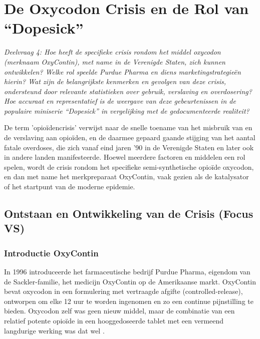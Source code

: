 \documentclass[11pt, a4paper]{report} %
\begin{document}
\chapter{De Oxycodon Crisis en de Rol van \enquote{Dopesick}}
\label{chap:oxycrisis}
\textit{Deelvraag 4: Hoe heeft de specifieke crisis rondom het middel oxycodon (merknaam OxyContin), met name in de Verenigde Staten, zich kunnen ontwikkelen? Welke rol speelde Purdue Pharma en diens marketingstrategieën hierin? Wat zijn de belangrijkste kenmerken en gevolgen van deze crisis, ondersteund door relevante statistieken over gebruik, verslaving en overdosering? Hoe accuraat en representatief is de weergave van deze gebeurtenissen in de populaire miniserie \enquote{Dopesick} in vergelijking met de gedocumenteerde realiteit?}

De term 'opioïdencrisis' verwijst naar de snelle toename van het misbruik van en de verslaving aan opioïden, en de daarmee gepaard gaande stijging van het aantal fatale overdoses, die zich vanaf eind jaren '90 in de Verenigde Staten en later ook in andere landen manifesteerde. Hoewel meerdere factoren en middelen een rol spelen, wordt de crisis rondom het specifieke semi-synthetische opioïde oxycodon, en dan met name het merkpreparaat OxyContin, vaak gezien als de katalysator of het startpunt van de moderne epidemie.

\section{Ontstaan en Ontwikkeling van de Crisis (Focus VS)}
\subsection{Introductie OxyContin}
In 1996 introduceerde het farmaceutische bedrijf Purdue Pharma, eigendom van de Sackler-familie, het medicijn OxyContin op de Amerikaanse markt. OxyContin bevat oxycodon in een formulering met vertraagde afgifte (controlled-release), ontworpen om elke 12 uur te worden ingenomen en zo een continue pijnstilling te bieden. Oxycodon zelf was geen nieuw middel, maar de combinatie van een relatief potente opioïde in een hooggedoseerde tablet met een vermeend langdurige werking was dat wel \parencite{CDCUnderstandingEpidemic, HealthlineDopesickTruth}.
\end{document}
